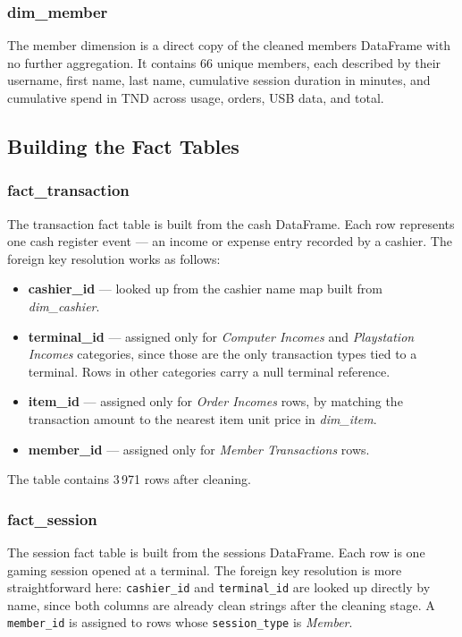 \subsubsection{dim\_member}

The member dimension is a direct copy of the cleaned members DataFrame with no
further aggregation. It contains 66 unique members, each described by their username,
first name, last name, cumulative session duration in minutes, and cumulative spend
in TND across usage, orders, USB data, and total.

\subsection{Building the Fact Tables}

\subsubsection{fact\_transaction}

The transaction fact table is built from the cash DataFrame. Each row represents one
cash register event — an income or expense entry recorded by a cashier. The foreign
key resolution works as follows:

\begin{itemize}[noitemsep]
  \item \textbf{cashier\_id} — looked up from the cashier name map built from
        \textit{dim\_cashier}.
  \item \textbf{terminal\_id} — assigned only for \textit{Computer Incomes} and
        \textit{Playstation Incomes} categories, since those are the only transaction
        types tied to a terminal. Rows in other categories carry a null terminal
        reference.
  \item \textbf{item\_id} — assigned only for \textit{Order Incomes} rows, by
        matching the transaction amount to the nearest item unit price in
        \textit{dim\_item}.
  \item \textbf{member\_id} — assigned only for \textit{Member Transactions} rows.
\end{itemize}

The table contains 3\,971 rows after cleaning.

\subsubsection{fact\_session}

The session fact table is built from the sessions DataFrame. Each row is one gaming
session opened at a terminal. The foreign key resolution is more straightforward here:
\texttt{cashier\_id} and \texttt{terminal\_id} are looked up directly by name, since
both columns are already clean strings after the cleaning stage. A \texttt{member\_id}
is assigned to rows whose \texttt{session\_type} is \textit{Member}.

